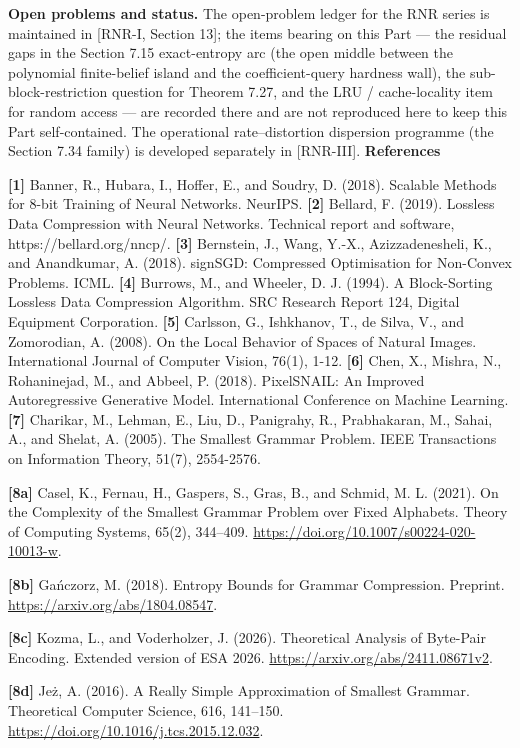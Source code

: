 \documentclass[
]{article}
\begin{document}
\textbf{Open problems and status.} The open-problem ledger for the RNR
series is maintained in [RNR-I, Section 13]; the items bearing on this Part
--- the residual gaps in the Section 7.15 exact-entropy arc (the open
middle between the polynomial finite-belief island and the
coefficient-query hardness wall), the sub-block-restriction question for
Theorem 7.27, and the LRU / cache-locality item for random access --- are
recorded there and are not reproduced here to keep this Part self-contained.
The operational rate--distortion dispersion programme (the Section 7.34
family) is developed separately in [RNR-III].
\textbf{References}

\textbf{{[}1{]}} Banner, R., Hubara, I., Hoffer, E., and Soudry, D.
(2018). Scalable Methods for 8-bit Training of Neural Networks. NeurIPS.
\textbf{{[}2{]}} Bellard, F. (2019). Lossless Data Compression with
Neural Networks. Technical report and software,
https://bellard.org/nncp/.
\textbf{{[}3{]}} Bernstein, J., Wang, Y.-X., Azizzadenesheli, K., and
Anandkumar, A. (2018). signSGD: Compressed Optimisation for Non-Convex
Problems. ICML.
\textbf{{[}4{]}} Burrows, M., and Wheeler, D. J. (1994). A Block-Sorting
Lossless Data Compression Algorithm. SRC Research Report 124, Digital
Equipment Corporation.
\textbf{{[}5{]}} Carlsson, G., Ishkhanov, T., de Silva, V., and
Zomorodian, A. (2008). On the Local Behavior of Spaces of Natural
Images. International Journal of Computer Vision, 76(1), 1-12.
\textbf{{[}6{]}} Chen, X., Mishra, N., Rohaninejad, M., and Abbeel, P.
(2018). PixelSNAIL: An Improved Autoregressive Generative Model.
International Conference on Machine Learning.
\textbf{{[}7{]}} Charikar, M., Lehman, E., Liu, D., Panigrahy, R.,
Prabhakaran, M., Sahai, A., and Shelat, A. (2005). The Smallest Grammar
Problem. IEEE Transactions on Information Theory, 51(7), 2554-2576.

\textbf{{[}8a{]}} Casel, K., Fernau, H., Gaspers, S., Gras, B.,
and Schmid, M. L. (2021). On the Complexity of the Smallest Grammar Problem
over Fixed Alphabets. Theory of Computing Systems, 65(2), 344--409.
\url{https://doi.org/10.1007/s00224-020-10013-w}.

\textbf{{[}8b{]}} Ga\'nczorz, M. (2018).
Entropy Bounds for Grammar Compression. Preprint.
\url{https://arxiv.org/abs/1804.08547}.

\textbf{{[}8c{]}} Kozma, L., and Voderholzer, J. (2026).
Theoretical Analysis of Byte-Pair Encoding. Extended version of ESA 2026.
\url{https://arxiv.org/abs/2411.08671v2}.

\textbf{{[}8d{]}} Je\.z, A. (2016). A Really Simple Approximation of
Smallest Grammar. Theoretical Computer Science, 616, 141--150.
\url{https://doi.org/10.1016/j.tcs.2015.12.032}.
\end{document}
